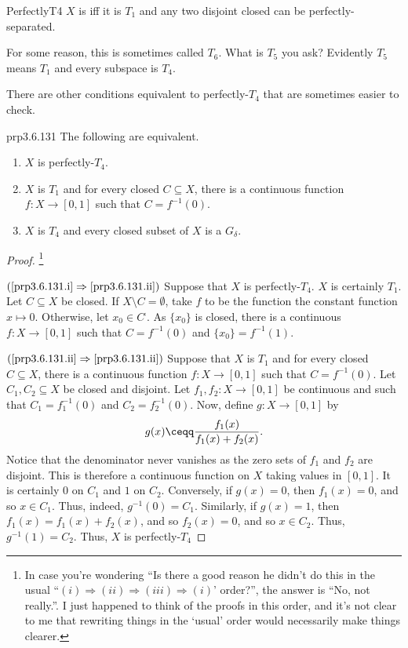 \begin{dfn}{}{PerfectlyT4}
$X$ is  iff it is $T_1$ and any two disjoint closed can be perfectly-separated.
\begin{rmk}
For some reason, this is sometimes called $T_6$.  What is $T_5$ you ask?  Evidently $T_5$ means $T_1$ and every subspace is $T_4$.
\end{rmk}
\end{dfn}
There are other conditions equivalent to perfectly-$T_4$ that are sometimes easier to check.
\begin{prp}{}{prp3.6.131}
The following are equivalent.
\begin{enumerate}
\item \label{prp3.6.131.i}$X$ is perfectly-$T_4$.
\item \label{prp3.6.131.ii}$X$ is $T_1$ and for every closed $C\subseteq X$, there is a continuous function $f\colon X\rightarrow [0,1]$ such that $C=f^{-1}(0)$.
\item \label{prp3.6.131.iii}$X$ is $T_4$ and every closed subset of $X$ is a $G_{\delta}$.
\end{enumerate}
\begin{proof}\footnote{In case you're wondering ``Is there a good reason he didn't do this in the usual ``$(i)\Rightarrow (ii)\Rightarrow (iii)\Rightarrow (i)$' order?'', the answer is ``No, not really.''.  I just happened to think of the proofs in this order, and it's not clear to me that rewriting things in the `usual' order would necessarily make things clearer.}
\forwardref

\noindent
$(\cref{prp3.6.131.i}\Rightarrow \cref{prp3.6.131.ii})$ Suppose that $X$ is perfectly-$T_4$.  $X$ is certainly $T_1$.  Let $C\subseteq X$ be closed.  If $X\setminus C=\emptyset$, take $f$ to be the function the constant function $x\mapsto 0$.  Otherwise, let $x_0\in C^{\comp}$.  As $\{ x_0\}$ is closed, there is a continuous $f\colon X\rightarrow [0,1]$ such that $C=f^{-1}(0)$ and $\{ x_0\} =f^{-1}(1)$.

\blankline
\noindent
$(\cref{prp3.6.131.ii}\Rightarrow \cref{prp3.6.131.ii})$ Suppose that $X$ is $T_1$ and for every closed $C\subseteq X$, there is a continuous function $f\colon X\rightarrow [0,1]$ such that $C=f^{-1}(0)$.  Let $C_1,C_2\subseteq X$ be closed and disjoint.  Let $f_1,f_2\colon X\rightarrow [0,1]$ be continuous and such that $C_1=f_1^{-1}(0)$ and $C_2=f_2^{-1}(0)$.  Now, define $g\colon X\rightarrow [0,1]$ by
\begin{equation}
g(x)\ceqq \frac{f_1(x)}{f_1(x)+f_2(x)}.
\end{equation}
Notice that the denominator never vanishes as the zero sets of $f_1$ and $f_2$ are disjoint.  This is therefore a continuous function on $X$ taking values in $[0,1]$.  It is certainly $0$ on $C_1$ and $1$ on $C_2$.  Conversely, if $g(x)=0$, then $f_1(x)=0$, and so $x\in C_1$.  Thus, indeed, $g^{-1}(0)=C_1$.  Similarly, if $g(x)=1$, then $f_1(x)=f_1(x)+f_2(x)$, and so $f_2(x)=0$, and so $x\in C_2$.  Thus, $g^{-1}(1)=C_2$.  Thus, $X$ is perfectly-$T_4$


\end{proof}
\end{prp}
